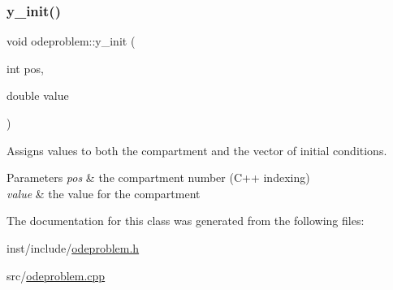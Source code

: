 \subsubsection{\texorpdfstring{y\+\_\+init()}{y\_init()}}
{\footnotesize\ttfamily void odeproblem\+::y\+\_\+init (\begin{DoxyParamCaption}\item[{int}]{pos,  }\item[{double}]{value }\end{DoxyParamCaption})}

Assigns values to both the compartment and the vector of initial conditions.


\begin{DoxyParams}{Parameters}
{\em pos} & the compartment number (C++ indexing) \\
\hline
{\em value} & the value for the compartment \\
\hline
\end{DoxyParams}


The documentation for this class was generated from the following files\+:\begin{DoxyCompactItemize}
\item 
inst/include/\hyperlink{odeproblem_8h}{odeproblem.\+h}\item 
src/\hyperlink{odeproblem_8cpp}{odeproblem.\+cpp}\end{DoxyCompactItemize}
